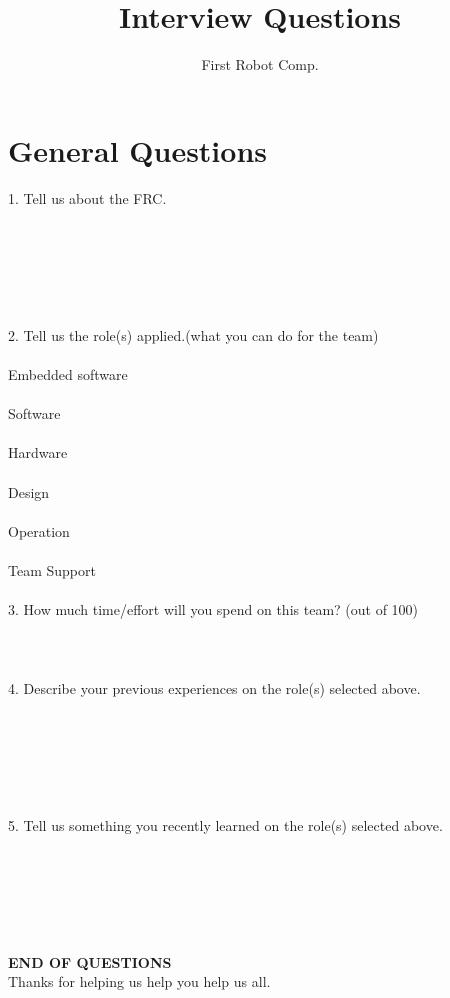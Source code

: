 \documentclass[12pt]{article}
\begin{document}
  
  
 \title{Interview Questions}
 \author{First Robot Comp.}
 \maketitle

 \section{General Questions}

 1. Tell us about the FRC.
\\\\\\\\\\\\\\
 2. Tell us the role(s) applied.(what you can do for the team)
\\\\
 \qedsymbol Embedded software
 \\\\
 \qedsymbol Software
 \\\\
 \qedsymbol Hardware
 \\\\
 \qedsymbol Design
 \\\\
 \qedsymbol Operation
 \\\\
 \qedsymbol Team Support
\\\\
 3. How much time/effort will you spend on this team? (out of 100)
\\\\\\\\
 4. Describe your previous experiences on the role(s) selected above.
\\\\\\\\\\\\\\
 5. Tell us something you recently learned on the role(s) selected above.
\\\\\\\\\\\\\\
\center\textbf{END OF QUESTIONS}
\\Thanks for helping us help you help us all.
  
 
\end{document}
